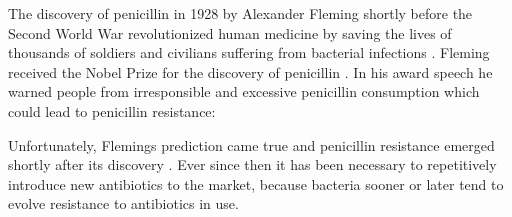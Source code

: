 The discovery of penicillin in 1928 by Alexander Fleming shortly before the Second World War revolutionized human medicine by saving the lives of thousands of soldiers and civilians suffering from bacterial infections \cite{cdc_biggest_2019}. Fleming received the Nobel Prize for the discovery of penicillin \cite{fleming}. In his award speech he warned people from irresponsible and excessive penicillin consumption which could lead to penicillin resistance:

 
 
Unfortunately, Flemings prediction came true and penicillin resistance emerged shortly after its discovery \cite{lobanovska_penicillins_2017}. Ever since then it has been necessary to repetitively introduce new antibiotics to the market, because bacteria sooner or later tend to evolve resistance to antibiotics in use. 

